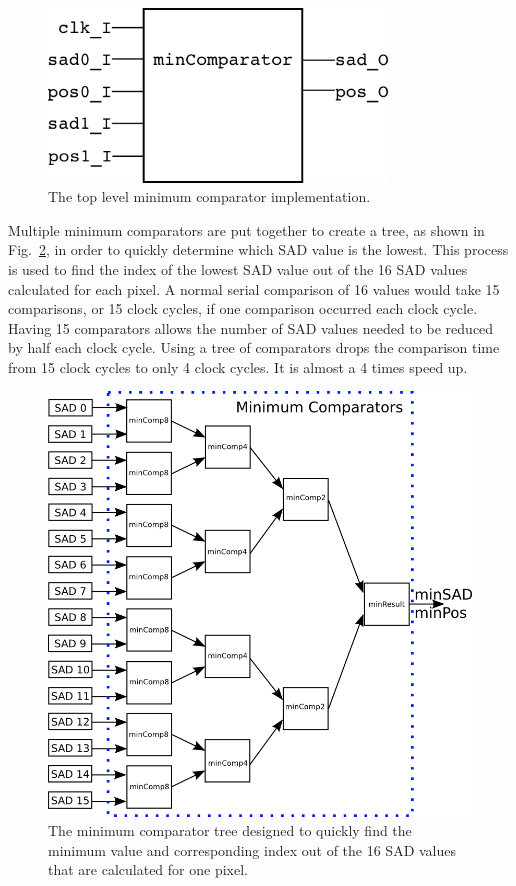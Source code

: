 \begin{figure}[h]
	\begin{center}
		\includegraphics[width=90mm]{figures/minComparator_rtl.png}
		\captionfonts
		\caption{The top level minimum comparator implementation.}
		\label{fig:minComp_rtl}
	\end{center}
\end{figure}

Multiple minimum comparators are put together to create a tree, as shown in Fig.~\ref{fig:minComp}, in order to quickly determine which SAD value is the lowest. This process is used to find the index of the lowest SAD value out of the 16 SAD values calculated for each pixel. A normal serial comparison of 16 values would take 15 comparisons, or 15 clock cycles, if one comparison occurred each clock cycle. Having 15 comparators allows the number of SAD values needed to be reduced by half each clock cycle. Using a tree of comparators drops the comparison time from 15 clock cycles to only 4 clock cycles. It is almost a 4 times speed up.

\begin{figure}[h]
	\begin{center}
		\includegraphics[width=150mm]{figures/minComparator.png}
		\captionfonts
		\caption{The minimum comparator tree designed to quickly find the minimum value and corresponding index out of the 16 SAD values that are calculated for one pixel.}
		\label{fig:minComp}
	\end{center}
\end{figure}

